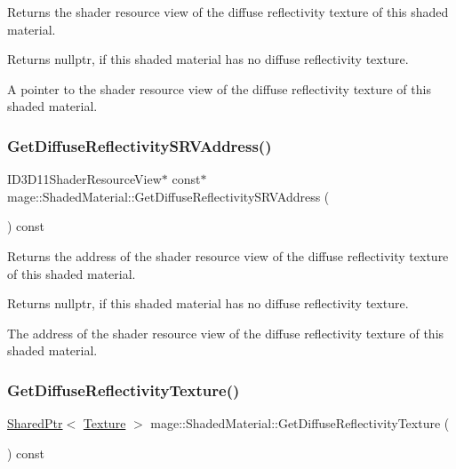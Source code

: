 Returns the shader resource view of the diffuse reflectivity texture of this shaded material.

\begin{DoxyReturn}{Returns}
{\ttfamily nullptr}, if this shaded material has no diffuse reflectivity texture. 

A pointer to the shader resource view of the diffuse reflectivity texture of this shaded material. 
\end{DoxyReturn}
\hypertarget{structmage_1_1_shaded_material_ac16eeb140fbe15f410021ad56c8d7f6d}{}\label{structmage_1_1_shaded_material_ac16eeb140fbe15f410021ad56c8d7f6d} 
\subsubsection{\texorpdfstring{Get\+Diffuse\+Reflectivity\+S\+R\+V\+Address()}{GetDiffuseReflectivitySRVAddress()}}
{\footnotesize\ttfamily I\+D3\+D11\+Shader\+Resource\+View$\ast$ const$\ast$ mage\+::\+Shaded\+Material\+::\+Get\+Diffuse\+Reflectivity\+S\+R\+V\+Address (\begin{DoxyParamCaption}{ }\end{DoxyParamCaption}) const\hspace{0.3cm}{\ttfamily [noexcept]}}

Returns the address of the shader resource view of the diffuse reflectivity texture of this shaded material.

\begin{DoxyReturn}{Returns}
{\ttfamily nullptr}, if this shaded material has no diffuse reflectivity texture. 

The address of the shader resource view of the diffuse reflectivity texture of this shaded material. 
\end{DoxyReturn}
\hypertarget{structmage_1_1_shaded_material_a461a080a923578673ce04c83cc3d9dbd}{}\label{structmage_1_1_shaded_material_a461a080a923578673ce04c83cc3d9dbd} 
\subsubsection{\texorpdfstring{Get\+Diffuse\+Reflectivity\+Texture()}{GetDiffuseReflectivityTexture()}}
{\footnotesize\ttfamily \hyperlink{namespacemage_a1e01ae66713838a7a67d30e44c67703e}{Shared\+Ptr}$<$ \hyperlink{classmage_1_1_texture}{Texture} $>$ mage\+::\+Shaded\+Material\+::\+Get\+Diffuse\+Reflectivity\+Texture (\begin{DoxyParamCaption}{ }\end{DoxyParamCaption}) const\hspace{0.3cm}{\ttfamily [noexcept]}}

